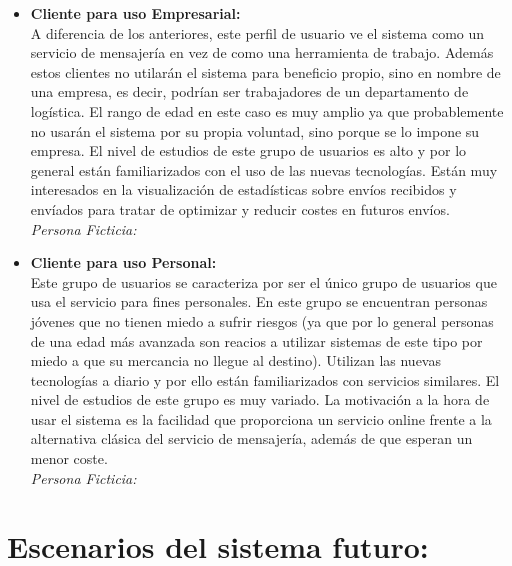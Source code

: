 \documentclass[10pt, a4paper,spanish]{article}
\begin{document}
\begin{itemize}
			\item \textbf{Cliente para uso Empresarial:} \\
				A diferencia de los anteriores, este perfil de usuario ve el sistema como un servicio de mensajería en vez de como una herramienta de trabajo. Además estos clientes no utilarán el sistema para beneficio propio, sino en nombre de una empresa, es decir, podrían ser trabajadores de un departamento de logística. El rango de edad en este caso es muy amplio ya que probablemente no usarán el sistema por su propia voluntad, sino porque se lo impone su empresa. El nivel de estudios de este grupo de usuarios es alto y por lo general están familiarizados con el uso de las nuevas tecnologías. Están muy interesados en la visualización de estadísticas sobre envíos recibidos y envíados para tratar de optimizar y reducir costes en futuros envíos.\\
				\textit{Persona Ficticia:}

			\item \textbf{Cliente para uso Personal:} \\
				Este grupo de usuarios se caracteriza por ser el único grupo de usuarios que usa el servicio para fines personales. En este grupo se encuentran personas jóvenes que no tienen miedo a sufrir riesgos (ya que por lo general personas de una edad más avanzada son reacios a utilizar sistemas de este tipo por miedo a que su mercancia no llegue al destino). Utilizan las nuevas tecnologías a diario y por ello están familiarizados con servicios similares. El nivel de estudios de este grupo es muy variado. La motivación a la hora de usar el sistema es la facilidad que proporciona un servicio online frente a la alternativa clásica del servicio de mensajería, además de que esperan un menor coste.\\
				\textit{Persona Ficticia:}

		\end{itemize}


	\section{Escenarios del sistema futuro:}

		\paragraph{}
\end{document}
